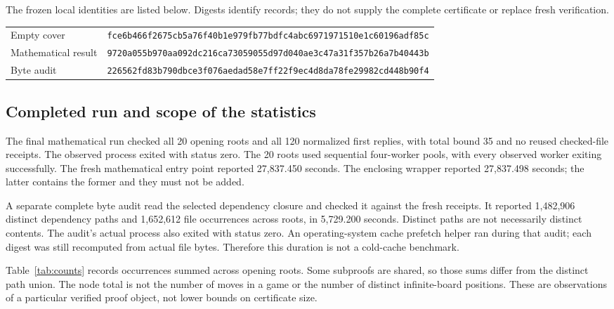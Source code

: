 \documentclass[11pt]{article}
\theoremstyle{definition}
\theoremstyle{remark}
\begin{document}
The frozen local identities are listed below. Digests identify records;
they do not supply the complete certificate or replace fresh verification.
\begin{center}\scriptsize
\begin{tabular}{@{}ll@{}}
Empty cover & \texttt{fce6b466f2675cb5a76f40b1e979fb77bdfc4abc6971971510e1c60196adf85c}\\
Mathematical result & \texttt{9720a055b970aa092dc216ca73059055d97d040ae3c47a31f357b26a7b40443b}\\
Byte audit & \texttt{226562fd83b790dbce3f076aedad58e7ff22f9ec4d8da78fe29982cd448b90f4}
\end{tabular}\end{center}

\subsection{Completed run and scope of the statistics}
The final mathematical run checked all 20 opening roots and all 120
normalized first replies, with total bound 35 and no reused checked-file
receipts. The observed process exited with status zero. The 20 roots used sequential four-worker pools, with every observed worker
exiting successfully. The fresh mathematical entry point
reported 27,837.450 seconds. The enclosing wrapper reported 27,837.498
seconds; the latter contains the former and they must not be added.

A separate complete byte audit read the selected dependency closure and
checked it against the fresh receipts. It reported 1,482,906 distinct
dependency paths and 1,652,612 file occurrences across roots, in
5,729.200 seconds. Distinct paths are not necessarily distinct contents.
The audit's actual process also exited with status zero. An operating-system
cache prefetch helper ran during that audit; each digest was still recomputed
from actual file bytes. Therefore this duration is not a cold-cache benchmark.

Table~\ref{tab:counts} records occurrences summed across opening roots.
Some subproofs are shared, so those sums differ from the distinct path union.
The node total is not the number of moves in a game or the number of
distinct infinite-board positions. These are observations of a particular
verified proof object, not lower bounds on certificate size.
\end{document}
